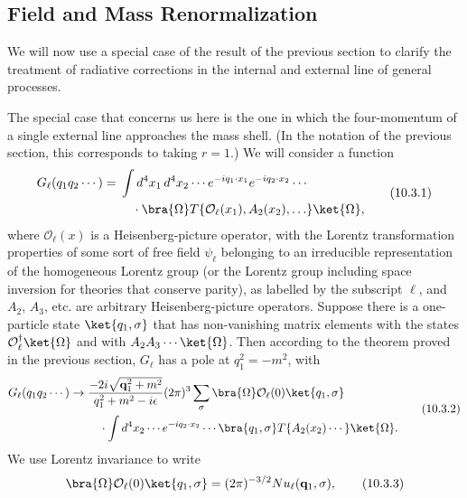 \subsection{Field and Mass Renormalization}

We will now use a special case of the result of the previous section to
clarify the treatment of radiative corrections in the internal and external
line of general processes.

The special case that concerns us here is the one in which the four-momentum
of a single external line approaches the mass shell. (In the notation of the
previous section, this corresponds to taking $r=1$.) We will consider a
function
\begin{equation}
\begin{split}
G_\ell(q_1q_2\cdots)={}&\int d^4x_1\,d^4x_2\cdots
 e^{-iq_1\cdot x_1}e^{-iq_2\cdot x_2}\cdots \\
&\quad\cdot\bra{\Omega}T\{\mathcal O_\ell(x_1),A_2(x_2),\ldots\}\ket{\Omega},
\end{split}
\tag{10.3.1}\label{eq:10.3.1}
\end{equation}
where $\mathcal O_\ell(x)$ is a Heisenberg-picture operator, with the Lorentz
transformation properties of some sort of free field $\psi_\ell$ belonging to
an irreducible representation of the homogeneous Lorentz group (or the Lorentz
group including space inversion for theories that conserve parity), as labelled
by the subscript $\ell$, and $A_2$, $A_3$, etc. are arbitrary
Heisenberg-picture operators. Suppose there is a one-particle state
$\ket{q_1,\sigma}$ that has non-vanishing matrix elements with the states
$\mathcal O_\ell^\dagger\ket{\Omega}$ and with $A_2A_3\cdots\ket{\Omega}$.
Then according to the theorem proved in the previous section, $G_\ell$ has a
pole at $q_1^2=-m^2$, with
\begin{equation}
\begin{split}
G_\ell(q_1q_2\cdots)\to{}&
\frac{-2i\sqrt{\mathbf q_1^2+m^2}}{q_1^2+m^2-i\epsilon}
(2\pi)^3\sum_\sigma
\bra{\Omega}\mathcal O_\ell(0)\ket{q_1,\sigma}
\\
&\quad\cdot\int d^4x_2\cdots e^{-iq_2\cdot x_2}\cdots
\bra{q_1,\sigma}T\{A_2(x_2)\cdots\}\ket{\Omega}.
\end{split}
\tag{10.3.2}\label{eq:10.3.2}
\end{equation}
We use Lorentz invariance to write
\begin{equation}
\bra{\Omega}\mathcal O_\ell(0)\ket{q_1,\sigma}
=(2\pi)^{-3/2}N u_\ell(\mathbf q_1,\sigma),
\tag{10.3.3}\label{eq:10.3.3}
\end{equation}
